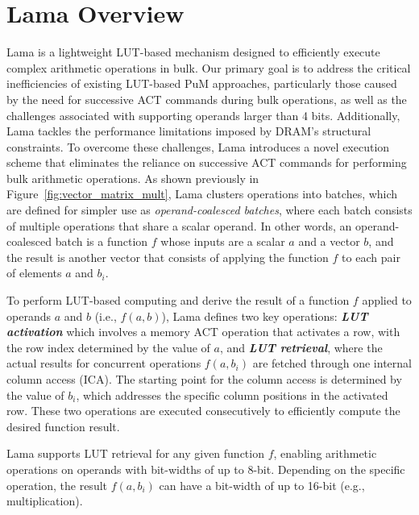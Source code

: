 \section{Lama Overview}\label{LamaOverview}
Lama is a lightweight LUT-based mechanism designed to efficiently execute complex arithmetic operations in bulk. Our primary goal is to address the critical inefficiencies of existing LUT-based PuM approaches, particularly those caused by the need for successive ACT commands during bulk operations, as well as the challenges associated with supporting operands larger than 4 bits. Additionally, Lama tackles the performance limitations imposed by DRAM's structural constraints. To overcome these challenges, Lama introduces a novel execution scheme that eliminates the reliance on successive ACT commands for performing bulk arithmetic operations. As shown previously in Figure~\ref{fig:vector_matrix_mult}, Lama clusters operations into batches, which are defined for simpler use as \textit{operand-coalesced batches}, where each batch consists of multiple operations that share a scalar operand. In other words, an operand-coalesced batch is a function $f$ whose inputs are a scalar $a$ and a vector $b$, and the result is another vector that consists of applying the function $f$ to each pair of elements $a$ and $b_{i}$.

To perform LUT-based computing and derive the result of a function $f$ applied to operands $a$ and $b$ (i.e., $f(a,b)$), Lama defines two key operations: \textbf{\textit{LUT activation}} which involves a memory ACT operation that activates a row, with the row index determined by the value of $a$, and \textbf{\textit{LUT retrieval}}, where the actual results for concurrent operations $f(a,b_{i})$ are fetched through one internal column access (ICA). The starting point for the column access is determined by the value of $b_{i}$, which addresses the specific column positions in the activated row. These two operations are executed consecutively to efficiently compute the desired function result.

Lama supports LUT retrieval for any given function $f$, enabling arithmetic operations on operands with bit-widths of up to 8-bit. Depending on the specific operation, the result $f(a,b_{i})$ can have a bit-width of up to 16-bit (e.g., multiplication).

